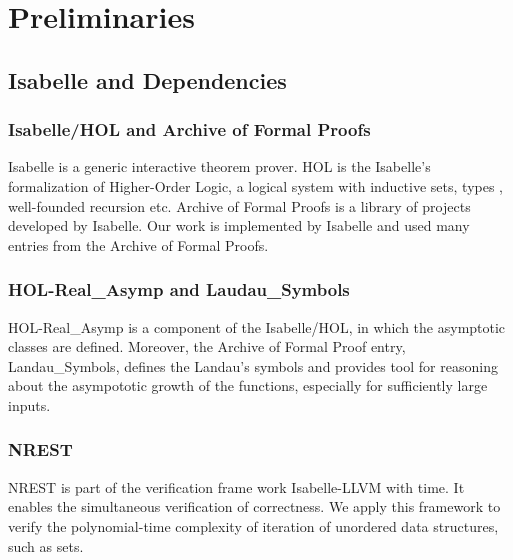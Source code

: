 \newcommand{\red}{\leq_p}
\newcommand{\problem}[3]{
\begin{definition}
    {#1} \\
    \textbf{Input}: {#2}\\
    \textbf{Output}: {#3}
\end{definition}
}
\newcommand{\bigO}[1]{$\mathcal{O}({#1})$}

\chapter{Preliminaries}\label{chapter:preliminaries}
\section{Isabelle and Dependencies}
\subsection*{Isabelle/HOL and Archive of Formal Proofs}
Isabelle is a generic interactive theorem prover. HOL is the Isabelle's formalization of Higher-Order Logic, 
a logical system with inductive sets, types , well-founded recursion etc. Archive of Formal Proofs is a library
of projects developed by Isabelle. Our work is implemented by Isabelle and used many entries from the Archive of Formal 
Proofs.

\subsection*{HOL-Real\_Asymp and Laudau\_Symbols}
HOL-Real\_Asymp is a component of the Isabelle/HOL, in which the asymptotic 
classes are defined. Moreover, the Archive of Formal Proof entry, Landau\_Symbols, 
defines the Landau's symbols and provides tool for reasoning about the asympototic
growth of the functions, especially for sufficiently large inputs. 

\subsection*{NREST}
NREST is part of the verification frame work Isabelle-LLVM with time. It enables 
the simultaneous verification of correctness. We apply this framework 
to verify the polynomial-time complexity of iteration of unordered data structures, such as sets.

